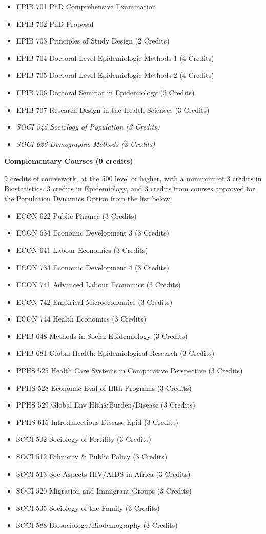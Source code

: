 \documentclass[
]{book}
\providecommand{\tightlist}{%
  \setlength{\itemsep}{0pt}\setlength{\parskip}{0pt}}
\begin{document}
\begin{itemize}
\tightlist
\item
  EPIB 701 PhD Comprehensive Examination
\item
  EPIB 702 PhD Proposal
\item
  EPIB 703 Principles of Study Design (2 Credits)
\item
  EPIB 704 Doctoral Level Epidemiologic Methods 1 (4 Credits)
\item
  EPIB 705 Doctoral Level Epidemiologic Methods 2 (4 Credits)
\item
  EPIB 706 Doctoral Seminar in Epidemiology (3 Credits)
\item
  EPIB 707 Research Design in the Health Sciences (3 Credits)
\item
  \emph{SOCI 545 Sociology of Population (3 Credits)}
\item
  \emph{SOCI 626 Demographic Methods (3 Credits)}
\end{itemize}

\textbf{Complementary Courses (9 credits)}

9 credits of coursework, at the 500 level or higher, with a minimum of 3 credits in Biostatistics, 3 credits in Epidemiology, and 3 credits from courses approved for the Population Dynamics Option from the list below:

\begin{itemize}
\tightlist
\item
  ECON 622 Public Finance (3 Credits)
\item
  ECON 634 Economic Development 3 (3 Credits)
\item
  ECON 641 Labour Economics (3 Credits)
\item
  ECON 734 Economic Development 4 (3 Credits)
\item
  ECON 741 Advanced Labour Economics (3 Credits)
\item
  ECON 742 Empirical Microeconomics (3 Credits)
\item
  ECON 744 Health Economics (3 Credits)
\item
  EPIB 648 Methods in Social Epidemiology (3 Credits)
\item
  EPIB 681 Global Health: Epidemiological Research (3 Credits)
\item
  PPHS 525 Health Care Systems in Comparative Perspective (3 Credits)
\item
  PPHS 528 Economic Eval of Hlth Programs (3 Credits)
\item
  PPHS 529 Global Env Hlth\&Burden/Disease (3 Credits)
\item
  PPHS 615 Intro:Infectious Disease Epid (3 Credits)
\item
  SOCI 502 Sociology of Fertility (3 Credits)
\item
  SOCI 512 Ethnicity \& Public Policy (3 Credits)
\item
  SOCI 513 Soc Aspects HIV/AIDS in Africa (3 Credits)
\item
  SOCI 520 Migration and Immigrant Groups (3 Credits)
\item
  SOCI 535 Sociology of the Family (3 Credits)
\item
  SOCI 588 Biosociology/Biodemography (3 Credits)
\end{itemize}
\end{document}
